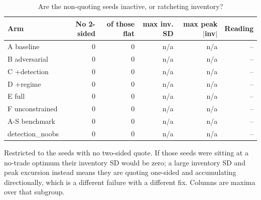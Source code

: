 \begin{table}[htbp]
  \centering
  \caption{Are the non-quoting seeds inactive, or ratcheting inventory?}
  \label{tab:inventory}
  \begin{tabular}{lrrrrr}
    \toprule
    Arm & No 2-sided & of those flat & max inv. SD & max peak $|$inv$|$ & Reading \\
    \midrule
    A  baseline & 0 & 0 & n/a & n/a & -- \\
    B  adversarial & 0 & 0 & n/a & n/a & -- \\
    C  +detection & 0 & 0 & n/a & n/a & -- \\
    D  +regime & 0 & 0 & n/a & n/a & -- \\
    E  full & 0 & 0 & n/a & n/a & -- \\
    F  unconstrained & 0 & 0 & n/a & n/a & -- \\
    A-S benchmark & 0 & 0 & n/a & n/a & -- \\
    detection\_noobs & 0 & 0 & n/a & n/a & -- \\
    \bottomrule
  \end{tabular}
  \begin{minipage}{\linewidth}\vspace{4pt}\footnotesize Restricted to the seeds with no two-sided quote. If those seeds were sitting at a no-trade optimum their inventory SD would be zero; a large inventory SD and peak excursion instead means they are quoting one-sided and accumulating directionally, which is a different failure with a different fix. Columns are maxima over that subgroup.\end{minipage}
\end{table}
